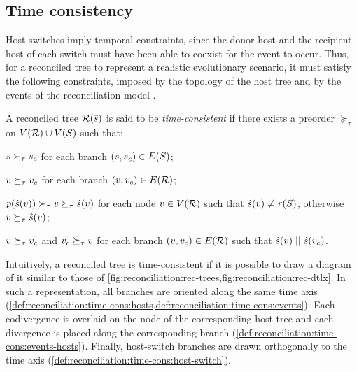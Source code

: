 \subsection{Time consistency}

Host switches imply temporal constraints, since the donor host and the recipient host of each switch must have been able to coexist for the event to occur.
Thus, for a reconciled tree to represent a realistic evolutionary scenario, it must satisfy the following constraints, imposed by the topology of the host tree and by the events of the reconciliation model
\parencite{Stolzer2012InferringDuplicationsLosses,Ma2017DTLReconciliationRepair}.

\begin{definition}\label{def:reconciliation:time-cons}
    A reconciled tree \(\mathcal{R}(\tilde{s})\) is said to be \emph{time-consistent} if there exists a preorder \(\succeq_\tau\) on \(V(\mathcal{R}) \cup V(S)\) such that:
    \begin{condition}
        \item \(s \succ_\tau s_c\) for each branch \((s, s_c) \in E(S)\); \label{def:reconciliation:time-cons:hosts}
        \item \(v \succeq_\tau v_c\) for each branch \((v, v_c) \in E(\mathcal{R})\); \label{def:reconciliation:time-cons:events}
        \item \(p(\hat{s}(v)) \succ_\tau v \succeq_\tau \hat{s}(v)\) for each node \(v \in V(\mathcal{R})\) such that \(\hat{s}(v) \neq r(S)\), otherwise \(v \succeq_\tau \hat{s}(v)\); \label{def:reconciliation:time-cons:events-hosts}
        \item \(v \succeq_\tau v_c\) and \(v_c \succeq_\tau v\) for each branch \((v, v_c) \in E(\mathcal{R})\) such that \(\hat{s}(v) \mathrel{||} \hat{s}(v_c)\). \label{def:reconciliation:time-cons:host-switch} \qedhere
    \end{condition}
\end{definition}

Intuitively, a reconciled tree is time-consistent if it is possible to draw a diagram of it similar to those of \cref{fig:reconciliation:rec-trees,fig:reconciliation:rec-dtlx}.
In such a representation, all branches are oriented along the same time axis (\cref{def:reconciliation:time-cons:hosts,def:reconciliation:time-cons:events}).
Each codivergence is overlaid on the node of the corresponding host tree and each divergence is placed along the corresponding branch (\cref{def:reconciliation:time-cons:events-hosts}).
Finally, host-switch branches are drawn orthogonally to the time axis (\cref{def:reconciliation:time-cons:host-switch}).

